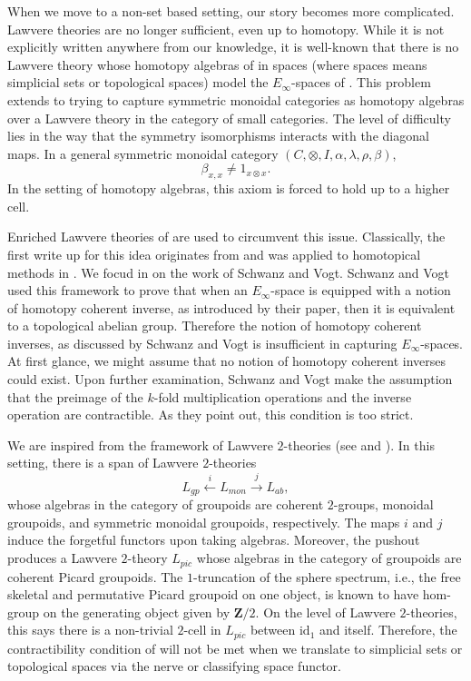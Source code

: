 \documentclass{tac}
\begin{document}
When we move to a non-set based setting, our story becomes more complicated. Lawvere theories are no longer sufficient, even up to homotopy. While it is not explicitly written anywhere from our knowledge, it is well-known that there is no Lawvere theory whose homotopy algebras of \cite{bern1} in spaces (where spaces means simplicial sets or topological spaces) model the $E_\infty$-spaces of \cite{May2}. This problem extends to trying to capture symmetric monoidal categories as homotopy algebras over a Lawvere theory in the category of small categories. The level of difficulty lies in the way that the symmetry isomorphisms interacts with the diagonal maps. In a general symmetric monoidal category $(C,\otimes, I,\alpha,\lambda,\rho,\beta)$, 
\[
\beta_{x,x}\neq 1_{x\otimes x}.
\]
In the setting of homotopy algebras, this axiom is forced to hold up to a higher cell.

Enriched Lawvere theories of \cite{Power1999} are used to circumvent this issue. Classically, the first write up for this idea originates from \cite{Gray1974} and was applied to homotopical methods in \cite{SchwanzlVogt1989}. We focud in on the work of Schwanz and Vogt.  Schwanz and Vogt used this framework to prove that when an $E_\infty$-space is equipped with a notion of homotopy coherent inverse, as introduced by their paper, then it is equivalent to a topological abelian group. Therefore the notion of homotopy coherent inverses, as discussed by Schwanz and Vogt is insufficient in capturing $E_\infty$-spaces. At first glance, we might assume that no notion of homotopy coherent inverses could exist.  Upon further examination, Schwanz and Vogt make the assumption that the preimage of the $k$-fold multiplication operations and the inverse operation are contractible. As they point out, this condition is too strict.

We are inspired from the framework of Lawvere $2$-theories (see \cite{Perutka2026} and \cite{yan1}). In this setting, there is a span of Lawvere $2$-theories
\[
L_{gp}\xleftarrow{i}L_{mon}\xrightarrow{j}L_{ab},
\]
whose algebras in the category of groupoids are coherent $2$-groups, monoidal groupoids, and symmetric monoidal groupoids, respectively. The maps $i$ and $j$ induce the forgetful functors upon taking algebras. Moreover, the pushout produces a Lawvere $2$-theory $L_{pic}$ whose algebras in the category of groupoids are coherent Picard groupoids. The $1$-truncation of the sphere spectrum, i.e., the free skeletal and permutative Picard groupoid on one object, is known to have hom-group on the generating object given by $\mathbf{Z}/2$. On the level of Lawvere $2$-theories, this says there is a non-trivial $2$-cell in $L_{pic}$ between $\text{id}_1$ and itself. Therefore, the contractibility condition of \cite{SchwanzlVogt1989} will not be met when we translate to simplicial sets or topological spaces via the nerve or classifying space functor. 
\end{document}
